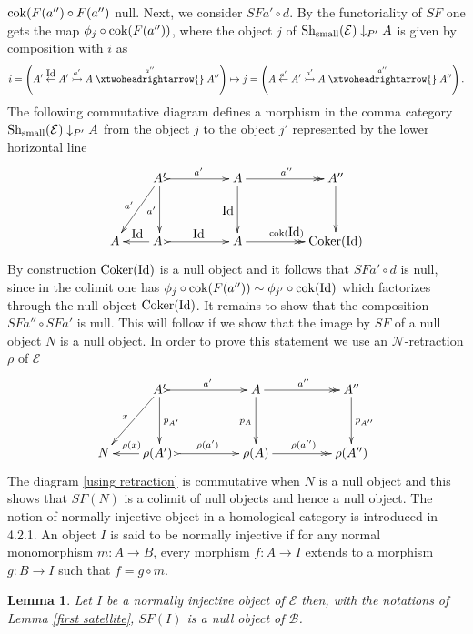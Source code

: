 \documentclass[12pt]{article}
\newtheorem{lem}[thm]{Lemma}
\def\id{{\rm id}}
\def\coker{{\rm Coker}}
\def\scoker{{\rm cok}}
\def\cB{{\mathcal B}}
\def\cE{{\mathcal E}}
\def\cN{{\mathcal N}}
\def\id{{\mbox{Id}}}
\def\sequ{{\rm Sh}}
\begin{document}
 $\scoker(F(a'')\circ F(a'')$ null. Next, we consider $SFa'\circ d$. By the functoriality of $SF$ one gets the map $\phi_j\circ  \scoker(F(a''))$, where the object $j$ of $\sequ_{\rm small}(\cE)\downarrow_{P'} A$ is given by composition with $i$ as
 $$
 i=\left(A'\stackrel{\id}{\leftarrow} A'\stackrel{a'}{\rightarrowtail}A\stackrel{a''}{\xtwoheadrightarrow{}}A''\right)\mapsto j=\left(A\stackrel{a'}{\leftarrow} A'\stackrel{a'}{\rightarrowtail}A\stackrel{a''}{\xtwoheadrightarrow{}}A''\right).
 $$
 The following commutative diagram defines a morphism in the comma category $\sequ_{\rm small}(\cE)\downarrow_{P'} A$ from the object $j$ to the object $j'$ represented by the lower horizontal line
\begin{equation}\label{colimit compat}
\xymatrix@C=20pt@R=35pt{
&  A' \ar[ld]_{a'}\ar[d]_{a'}\ar@{>->}[rr]^{a'} && A\ar[d]_{\id} \ar@{->>}[rr]^{a''}&& A''\ar[d]
\\
A & \ar[l]_{\id}A \ \ar@{>->}[rr]^{\id}&& A \ar@{->>}[rr]^{\scoker(\id)}&& \coker(\id) }
\end{equation}
 By construction  $\coker(\id)$ is a null object and it follows that $SFa'\circ d$ is null, since in the colimit one has  $\phi_j\circ  \scoker(F(a''))\sim \phi_{j'}\circ  \scoker(\id)$ which factorizes through the null object $\coker(\id)$. It remains to show that the composition $SFa''\circ SFa'$ is null. This will follow if we show that the image by $SF$ of a null object $N$ is a null object. In order to prove this statement we use an  $\cN$-retraction $\rho$ of $\cE$ 
\begin{equation}\label{using retraction}
\xymatrix@C=20pt@R=35pt{
&  A' \ar[ld]_{x}\ar[d]^{p_{A'}}\ar@{>->}[rr]^{a'} && A\ar[d]_{p_A} \ar@{->>}[rr]^{a''}&& A''\ar[d]^{p_{A''}}
\\
N &\ar[l]_{\rho(x)} \rho(A') \ \ar@{>->}[rr]^{\rho(a')}&& \rho(A) \ar@{->>}[rr]^{\rho(a'')}&& \rho(A'') }
\end{equation}
The  diagram \eqref{using retraction} is commutative when $N$ is a null object and this  shows that $SF(N)$ is a colimit of null objects and hence a null object. \endproof 
The notion of normally injective object in a homological category is introduced in \cite{gra1} 4.2.1. An object $I$ is said to be normally injective if for any normal monomorphism $m:A\to B$, every morphism $f:A\to I$ extends to a morphism $g:B\to I$ such that $f=g\circ m$. 
\begin{lem}\label{inject vanishing}Let $I$ be a normally injective object of $\cE$ then, with the notations of Lemma \ref{first satellite},  $SF(I)$ is a null object of $\cB$.	
\end{lem}
\end{document}
